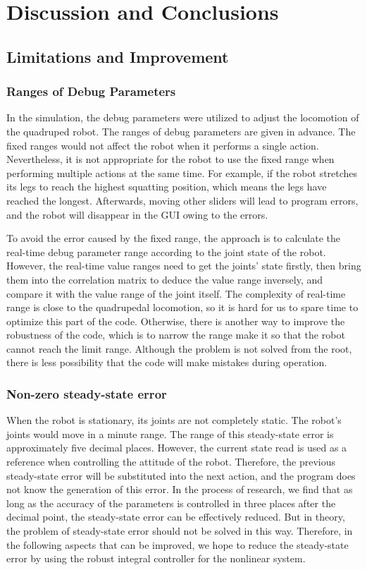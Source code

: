 \chapter{Discussion and Conclusions}

\section{Limitations and Improvement}

\subsection{Ranges of Debug Parameters}

In the simulation, the debug parameters were utilized to adjust the locomotion of the quadruped robot. The ranges of debug parameters are given in advance. The fixed ranges would not affect the robot when it performs a single action. Nevertheless, it is not appropriate for the robot to use the fixed range when performing multiple actions at the same time. For example, if the robot stretches its legs to reach the highest squatting position, which means the legs have reached the longest. Afterwards, moving other sliders will lead to program errors, and the robot will disappear in the GUI\cite{ref:GUI} owing to the errors.

To avoid the error caused by the fixed range, the approach is to calculate the real-time debug parameter range according to the joint state of the robot. However, the real-time value ranges need to get the joints' state firstly, then bring them into the correlation matrix to deduce the value range inversely, and compare it with the value range of the joint itself. The complexity of real-time range is close to the quadrupedal locomotion, so it is hard for us to spare time to optimize this part of the code. Otherwise, there is another way to improve the robustness of the code, which is to narrow the range make it so that the robot cannot reach the limit range. Although the problem is not solved from the root, there is less possibility that the code will make mistakes during operation.

\subsection{Non-zero steady-state error}

When the robot is stationary, its joints are not completely static. The robot's joints would move in a minute range. The range of this steady-state error is approximately five decimal places. However, the current state read is used as a reference when controlling the attitude of the robot. Therefore, the previous steady-state error will be substituted into the next action, and the program does not know the generation of this error. In the process of research, we find that as long as the accuracy of the parameters is controlled in three places after the decimal point, the steady-state error can be effectively reduced. But in theory, the problem of steady-state error should not be solved in this way. Therefore, in the following aspects that can be improved, we hope to reduce the steady-state error by using the robust integral controller\cite{ref:RNIcontrol} for the nonlinear system.

